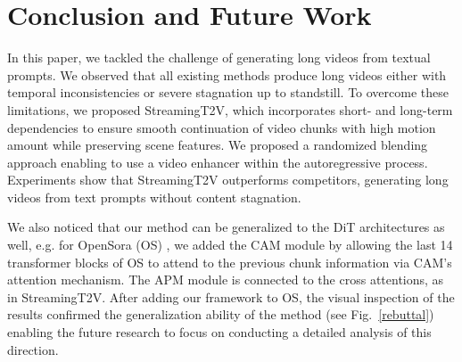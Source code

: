 \section{Conclusion and Future Work}


In this paper, we tackled the challenge of generating long videos from textual prompts. We observed that all existing methods produce long videos either with temporal inconsistencies or severe stagnation up to standstill.
To overcome these limitations,  we proposed StreamingT2V, which incorporates short- and long-term dependencies to ensure smooth continuation of video chunks with high motion amount while preserving scene features. 
We proposed a randomized blending approach enabling to use a video enhancer within the autoregressive process. 
Experiments show that StreamingT2V outperforms competitors, generating long videos from text prompts without content stagnation.

We also noticed that our method can be generalized to the DiT architectures as well, e.g. for OpenSora (OS) \cite{opensora}, we added the CAM module by allowing the last 14 transformer blocks of OS to attend to the previous chunk information via CAM’s attention mechanism. 
The APM module is connected to the cross attentions, as in StreamingT2V. 
After adding our framework to OS, the visual inspection of the results confirmed the generalization ability of the method (see Fig.\ \ref{rebuttal}) enabling the future research to focus on conducting a detailed analysis of this direction.